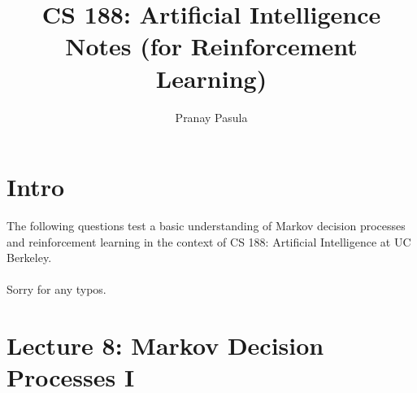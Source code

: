 \documentclass[]{article}
\title{CS 188: Artificial Intelligence Notes (for Reinforcement Learning)}
\author{Pranay Pasula}
\begin{document}
\maketitle

\section*{Intro}
The following questions test a basic understanding of Markov decision processes and reinforcement learning in the context of CS 188: Artificial Intelligence at UC Berkeley. \\\\
Sorry for any typos. \\

\section*{Lecture 8: Markov Decision Processes I}
\end{document}
